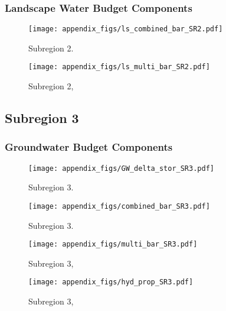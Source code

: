 \subsubsection{Landscape Water Budget Components}
\begin{figure}[ht]
\centerline{\texttt{[image: appendix\_figs/ls\_combined\_bar\_SR2.pdf]}}
\caption{\LSCombinedTextOne Subregion 2.\LSCombinedTextTwo}
\label{fig:LS_budget_SR2}
\end{figure}
\newpage

\begin{landscape}
\begin{figure}[ht]
\centerline{\texttt{[image: appendix\_figs/ls\_multi\_bar\_SR2.pdf]}}
\caption{\LSMultiTextOne Subregion 2,\LSMultiTextTwo}
\label{fig:multi_LS_budget_SR2}
\end{figure}
\newpage
\end{landscape}

\subsection{Subregion 3}
\subsubsection{Groundwater Budget Components}
\begin{figure}[h]
\centerline{\texttt{[image: appendix\_figs/GW\_delta\_stor\_SR3.pdf]}}
\caption{\GWBudgetText Subregion 3.}
\label{fig:delta_stor_SR3}
\end{figure}
\newpage

\begin{figure}[ht]
\centerline{\texttt{[image: appendix\_figs/combined\_bar\_SR3.pdf]}}
\caption{\GWCombinedTextOne Subregion 3.\GWCombinedTextTwo}
\label{fig:GW_budget_SR3}
\end{figure}
\newpage

\begin{landscape}
\begin{figure}[ht]
\centerline{\texttt{[image: appendix\_figs/multi\_bar\_SR3.pdf]}}
\caption{\GWMultiTextOne Subregion 3,\GWMultiTextTwo}
\label{fig:multi_GW_budget_SR3}
\end{figure}
\newpage

\begin{figure}[ht]
\centerline{\texttt{[image: appendix\_figs/hyd\_prop\_SR3.pdf]}}
\caption{\HydPropOne Subregion 3,\HydPropTwo}
\label{fig:hyd_prop_SR3}
\end{figure}
\newpage
\end{landscape}

